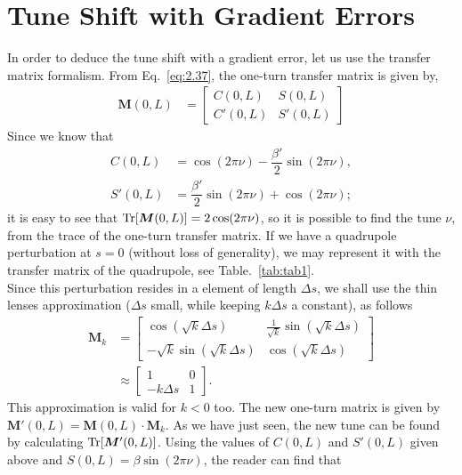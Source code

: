 \section{Tune Shift with Gradient Errors}\label{sec:dtune_grad_err}

In order to deduce the tune shift with a gradient error, let us use the transfer matrix formalism. From Eq.~\eqref{eq:2.37}, the one-turn transfer matrix is given by,
\begin{align*}
	\boldsymbol{M}(0,L)
    &= \begin{bmatrix}
	C(0,L) & S(0,L)\\
	C'(0,L) & S'(0,L)
	\end{bmatrix}
\end{align*}
 Since we know that
\begin{align*}
	C(0,L) &= \cos(2\pi\nu) - \dfrac{\beta'}{2} \sin(2\pi\nu),\\
    S'(0,L) &= \dfrac{\beta'}{2} \sin(2\pi\nu) + \cos(2\pi\nu);
\end{align*}
it is easy to see that $\operatorname{Tr} [\boldsymbol{M}(0,L)] = 2\cos(2\pi\nu)$, so it is possible to find the tune $\nu$, from the trace of the one-turn transfer matrix.
If we have a quadrupole perturbation at $s=0$ (without loss of generality), we may represent it with the transfer matrix of the quadrupole, see Table.~\ref{tab:tab1}.\\
Since this perturbation resides in a element of length $\Delta s$, we shall use the thin lenses approximation ($\Delta s$ small, while keeping $k\Delta s$ a constant), as follows
\begin{align}
	\boldsymbol{M}_k &=
	\begin{bmatrix}
			\cos(\sqrt{k}\Delta s) & \frac{1}{\sqrt{k}}\sin(\sqrt{k}\Delta s)\\
			-\sqrt{k}\sin(\sqrt{k}\Delta s) & \cos(\sqrt{k}\Delta s)
	\end{bmatrix}\\
    & \approx
    \begin{bmatrix}
			1 & 0\\
			-k \Delta s & 1
	\end{bmatrix}.
\end{align}
This approximation is valid for $k < 0$ too. The new one-turn matrix is given by $\boldsymbol{M}'(0,L) = \boldsymbol{M}(0,L) \cdot \boldsymbol{M}_k$. As we have just seen, the new tune can be found by calculating $\operatorname{Tr}[\boldsymbol{M}'(0,L)]$. Using the values of $C(0,L)$ and $S'(0,L)$ given above and $S(0,L) = \beta \sin(2\pi\nu)$, the reader can find that
